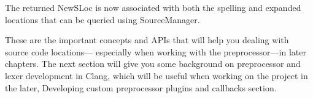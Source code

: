 The returned NewSLoc is now associated with both the spelling and expanded locations that can be queried using SourceManager.

These are the important concepts and APIs that will help you dealing with source code locations— especially when working with the preprocessor—in later chapters. The next section will give you some background on preprocessor and lexer development in Clang, which will be useful when working on the project in the later, Developing custom preprocessor plugins and callbacks section.













